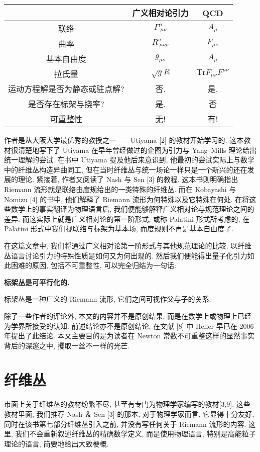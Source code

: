 \documentclass{article}
\begin{document}
\begin{center}
\begin{tabular}{|c|c|c|}
  \hline
   & 广义相对论引力 & QCD \\
   \hline
  联络 & $\Gamma^{\rho}_{\ \mu\nu}$ & $A_{\mu}$ \\
  曲率 & $R^{\sigma}_{\ \mu\nu\rho}$ & $F_{\mu\nu}$ \\
  基本自由度 & $g_{\mu\nu}$ & $A_{\mu}$ \\
  拉氏量 & $\sqrt{g}R$ & $\textrm{Tr}{F_{\mu\nu}F^{\mu\nu}}$ \\
  运动方程解是否为静态或驻点解? & 否. & 是. \\
  是否存在标架与挠率? & 是. & 否 \\
  可重整性 & 无! & 有! \\
  \hline
\end{tabular}
\end{center}

\indent 作者是从大阪大学最优秀的教授之一——Utiyama [2] 的教材开始学习的. 这本教材很清楚地写下了 Utiyama 在早年曾经做过的企图为引力与 Yang--Mills 理论给出统一理解的尝试. 在书中 Utiyama 提及他后来意识到, 他最初的尝试实际上与数学中的纤维丛构造异曲同工, 但在当时纤维丛与统一场论一样只是一个新兴的还在发展的理论. 紧接着, 作者又阅读了 Nash 与 Sen [3] 的教程. 这本书则明确指出 Riemann 流形就是联络由度规给出的一类特殊的纤维丛. 而在 Kobayashi 与 Nomizu [4] 的书中, 他们解释了 Riemann 流形为何特殊以及它特殊在何处. 在将这些数学上的事实翻译为物理语言后, 我们便能够解释广义相对论与规范理论之间的差异. 而这实际上就是广义相对论的第一阶形式, 或称 Palatini 形式所考虑的, 在 Palatini 形式中我们视联络与标架为基本场, 而度规则不再是基本自由度了.
\par
在这篇文章中, 我们将通过广义相对论第一阶形式与其他规范理论的比较, 以纤维丛语言讨论引力的特殊性质是如何又为何出现的. 然后我们便能得出量子化引力如此困难的原因, 包括不可重整性, 可以完全归结为一句话:
\begin{center}
\textbf{标架丛是可平行化的.}
\end{center}
标架丛是一种广义的 Riemann 流形, 它们之间可视作父与子的关系.
\par
除了一些作者的评论外, 本文的内容并不是原创结果, 而是在数学上或物理上已经为学界所接受的认知. 前述结论亦不是原创结论, 在文献 [8] 中 Heller 早已在 2006 年提出了此结论. 本文主要目的是为读者在 Newton 常数不可重整这样的显然事实背后的深邃之中, 攫取一丝不一样的光芒.
\section{纤维丛}
市面上关于纤维丛的教材纷繁不尽, 甚至有专门为物理学家编写的教材[3,9]. 这些教材里面, 我们推荐 Nash ＆ Sen [3] 的那本, 对于物理学家而言, 它显得十分友好, 同时在该书第七部分纤维丛引入之前, 并没有写任何关于 Riemann 流形的内容. 这里, 我们不会重新叙述纤维丛的精确数学定义, 而是使用物理语言, 特别是高能粒子理论的语言, 简要地给出大致梗概.
\end{document}
